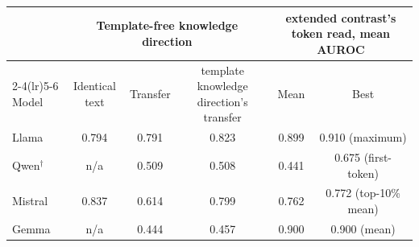 \begin{tabular}{@{}l ccc cc@{}}
\toprule
 & \multicolumn{3}{c}{Template-free knowledge direction} & \multicolumn{2}{c}{extended contrast's token read, mean AUROC} \\
\cmidrule(lr){2-4}\cmidrule(lr){5-6}
Model & Identical text & Transfer & template knowledge direction's transfer & Mean & Best \\
\midrule
Llama & 0.794 & 0.791 & 0.823 & 0.899 & 0.910 (maximum) \\
Qwen$^\dagger$ & n/a & 0.509 & 0.508 & 0.441 & 0.675 (first-token) \\
Mistral & 0.837 & 0.614 & 0.799 & 0.762 & 0.772 (top-10\% mean) \\
Gemma & n/a & 0.444 & 0.457 & 0.900 & 0.900 (mean) \\
\bottomrule
\end{tabular}
